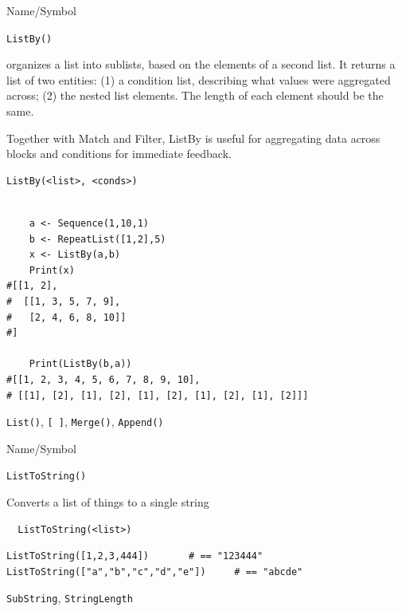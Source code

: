 \begin{desc}{Name/Symbol}
\item[Name/Symbol]	\verb+ListBy()+

\item[Description]	organizes a list into sublists, based on the
  elements of a second list.  It returns a list of two entities: (1) a
  condition list, describing what values were aggregated across; (2)
  the nested list elements.  The length of each element should be the same.

Together with Match and Filter, ListBy is useful for aggregating data across blocks and conditions for immediate feedback.

\item[Usage]
\begin{verbatim}
ListBy(<list>, <conds>)
\end{verbatim}

\item[Example]
\begin{verbatim}

	a <- Sequence(1,10,1)
    b <- RepeatList([1,2],5)
    x <- ListBy(a,b)
    Print(x)
#[[1, 2],
#  [[1, 3, 5, 7, 9],
#   [2, 4, 6, 8, 10]]
#]

    Print(ListBy(b,a))
#[[1, 2, 3, 4, 5, 6, 7, 8, 9, 10],
# [[1], [2], [1], [2], [1], [2], [1], [2], [1], [2]]]

\end{verbatim}

\item[See Also]	\verb+List()+, \verb+[ ]+, \verb+Merge()+, \verb+Append()+
\end{desc}
 
\begin{desc}{Name/Symbol}
\item[Name/Symbol]	\verb+ListToString()+

\item[Description]	Converts a list of things to a single string

\item[Usage]
\begin{verbatim}
  ListToString(<list>)
\end{verbatim}

\item[Example]
\begin{verbatim}
ListToString([1,2,3,444])		# == "123444"
ListToString(["a","b","c","d","e"])		# == "abcde"

\end{verbatim}

\item[See Also] \verb+SubString+, \verb+StringLength+
\end{desc}

